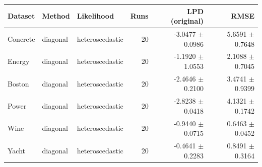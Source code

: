 \begin{tabular}{lllrrr}
\toprule
Dataset & Method & Likelihood & Runs & LPD (original) & RMSE \\
\midrule
Concrete & diagonal & heteroscedastic & 20 & -3.0477 $\pm$ 0.0986 & 5.6591 $\pm$ 0.7648 \\
Energy & diagonal & heteroscedastic & 20 & -1.1920 $\pm$ 1.0553 & 2.1088 $\pm$ 0.7045 \\
Boston & diagonal & heteroscedastic & 20 & -2.4646 $\pm$ 0.2100 & 3.4741 $\pm$ 0.9399 \\
Power & diagonal & heteroscedastic & 20 & -2.8238 $\pm$ 0.0418 & 4.1321 $\pm$ 0.1742 \\
Wine & diagonal & heteroscedastic & 20 & -0.9440 $\pm$ 0.0715 & 0.6463 $\pm$ 0.0452 \\
Yacht & diagonal & heteroscedastic & 20 & -0.4641 $\pm$ 0.2283 & 0.8491 $\pm$ 0.3164 \\
\bottomrule
\end{tabular}
